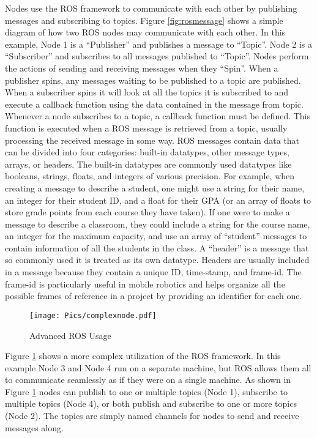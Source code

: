 Nodes use the ROS framework to communicate with each other by publishing messages and subscribing to topics. Figure \ref{fig:rosmessage} shows a simple diagram of how two ROS nodes may communicate with each other. In this example, Node 1 is a ``Publisher'' and publishes a message to ``Topic''. Node 2 is a ``Subscriber'' and subscribes to all messages published to ``Topic''. Nodes perform the actions of sending and receiving messages when they ``Spin''. When a publisher spins, any messages waiting to be published to a topic are published. When a subscriber spins it will look at all the topics it is subscribed to and execute a callback function using the data contained in the message from topic. Whenever a node subscribes to a topic, a callback function must be defined. This function is executed when a ROS message is retrieved from a topic, usually processing the received message in some way. ROS messages contain data that can be divided into four categories: built-in datatypes, other message types, arrays, or headers. The built-in datatypes are commonly used datatypes like booleans, strings, floats, and integers of various precision. For example, when creating a message to describe a student, one might use a string for their name, an integer for their student ID, and a float for their GPA (or an array of floats to store grade points from each course they have taken). If one were to make a message to describe a classroom, they could include a string for the course name, an integer for the maximum capacity, and use an array of ``student'' messages to contain information of all the students in the class. A ``header'' is a message that so commonly used it is treated as its own datatype. Headers are usually included in a message because they contain a unique ID, time-stamp, and frame-id. The frame-id is particularly useful in mobile robotics and helps organize all the possible frames of reference in a project by providing an identifier for each one.\\

\begin{figure}[h!]
    \centering
    \texttt{[image: Pics/complexnode.pdf]}
    \caption{Advanced ROS Usage}
    \label{fig:roscomplex}
\end{figure}

Figure \ref{fig:roscomplex} shows a more complex utilization of the ROS framework. In this example Node 3 and Node 4 run on a separate machine, but ROS allows them all to communicate seamlessly as if they were on a single machine. As shown in Figure \ref{fig:roscomplex} nodes can publish to one or multiple topics (Node 1), subscribe to multiple topics (Node 4), or both publish and subscribe to one or more topics (Node 2). The topics are simply named channels for nodes to send and receive messages along.\\

